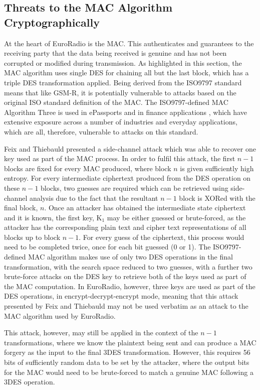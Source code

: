 \documentclass[twoside,11pt,a4paper]{article}
\begin{document}
\subsection{Threats to the MAC Algorithm Cryptographically}
At the heart of EuroRadio is the MAC. This authenticates and guarantees to the receiving party that the data being received is genuine and has not been corrupted or modified during transmission. As highlighted in this section, the MAC algorithm uses single DES for chaining all but the last block, which has a triple DES transformation applied. Being derived from the ISO9797 standard means that like GSM-R, it is potentially vulnerable to attacks based on the original ISO standard definition of the MAC. The ISO9797-defined MAC Algorithm Three is used in ePassports \citep{Chothia10a} and in finance applications \citep{IBM}, which have extensive exposure across a number of industries and everyday applications, which are all, therefore, vulnerable to attacks on this standard.

Feix and Thiebauld \citep{MACAlgo3SideChannel} presented a side-channel attack which was able to recover one key used as part of the MAC process. In order to fulfil this attack, the first $n - 1$ blocks are fixed for every MAC produced, where block $n$ is given sufficiently high entropy. For every intermediate ciphertext produced from the DES operation on these $n - 1$ blocks, two guesses are required which can be retrieved using side-channel analysis due to the fact that the resultant $n - 1$ block is XORed with the final block, $n$. Once an attacker has obtained the intermediate state ciphertext and it is known, the first key, K$_1$ may be either guessed or brute-forced, as the attacker has the corresponding plain text and cipher text representations of all blocks up to block $n - 1$. For every guess of the ciphertext, this process would need to be completed twice, once for each bit guessed (0 or 1). The ISO9797-defined MAC algorithm makes use of only two DES operations in the final transformation, with the search space reduced to two guesses, with a further two brute-force attacks on the DES key to retrieve both of the keys used as part of the MAC computation. In EuroRadio, however, three keys are used as part of the DES operations, in encrypt-decrypt-encrypt mode, meaning that this attack presented by Feix and Thiebauld may not be used verbatim as an attack to the MAC algorithm used by EuroRadio.

This attack, however, may still be applied in the context of the $n - 1$ transformations, where we know the plaintext being sent and can produce a MAC forgery as the input to the final 3DES transformation. However, this requires 56 bits of sufficiently random data to be set by the attacker, where the output bits for the MAC would need to be brute-forced to match a genuine MAC following a 3DES operation.
\end{document}
